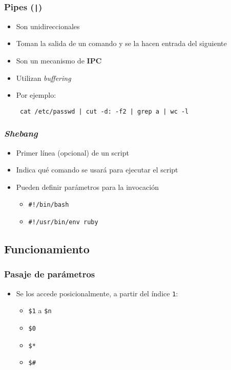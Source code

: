 \begin{frame}[fragile]
  \frametitle{Pipes (\texttt{|})}
  \begin{itemize}
    \item Son unidireccionales
    \item Toman la salida de un comando y se la hacen entrada del siguiente
    \item Son un mecanismo de \textbf{IPC}
    \item Utilizan \textit{buffering}
    \item Por ejemplo:
   \begin{lstlisting}
 cat /etc/passwd | cut -d: -f2 | grep a | wc -l
   \end{lstlisting}
  \end{itemize}
\end{frame}

\begin{frame}
  \frametitle{\textit{Shebang}}
  \begin{itemize}
    \item Primer línea (opcional) de un script
    \item Indica qué comando se usará para ejecutar el script
    \item Pueden definir parámetros para la invocación
    \begin{itemize}
      \item \texttt{\#!/bin/bash}
      \item \texttt{\#!/usr/bin/env ruby}
    \end{itemize}
  \end{itemize}
\end{frame}

\subsection{Funcionamiento}

\begin{frame}
  \frametitle{Pasaje de parámetros}
  \begin{itemize}
    \item Se los accede posicionalmente, a partir del índice \texttt{1}:
    \begin{itemize}
      \item \texttt{\$1} a \texttt{\$n}
      \item \texttt{\$0}
      \item \texttt{\$*}
      \item \texttt{\$\#}
    \end{itemize}
  \end{itemize}
\end{frame}

